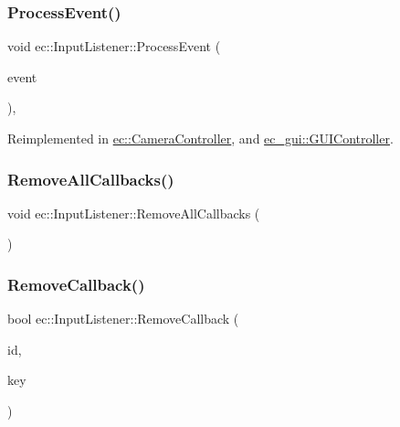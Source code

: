\mbox{\label{classec_1_1_input_listener_a25ef07efb72ac5c880cbca876ddfe66a}} 
\subsubsection{\texorpdfstring{Process\+Event()}{ProcessEvent()}}
{\footnotesize\ttfamily void ec\+::\+Input\+Listener\+::\+Process\+Event (\begin{DoxyParamCaption}\item[{const \mbox{\hyperlink{structec_1_1_input_event}{Input\+Event}} \&}]{event }\end{DoxyParamCaption})\hspace{0.3cm}{\ttfamily [protected]}, {\ttfamily [virtual]}}



Reimplemented in \mbox{\hyperlink{classec_1_1_camera_controller_a0e2d455602581a484daf81bdb60a01bc}{ec\+::\+Camera\+Controller}}, and \mbox{\hyperlink{classec__gui_1_1_g_u_i_controller_a3d9e413ddf78d41e929ec652c5409f3c}{ec\+\_\+gui\+::\+G\+U\+I\+Controller}}.

\mbox{\label{classec_1_1_input_listener_af7dd3e51508a10667973c36ef7ef48a8}} 
\subsubsection{\texorpdfstring{Remove\+All\+Callbacks()}{RemoveAllCallbacks()}}
{\footnotesize\ttfamily void ec\+::\+Input\+Listener\+::\+Remove\+All\+Callbacks (\begin{DoxyParamCaption}{ }\end{DoxyParamCaption})}

\mbox{\label{classec_1_1_input_listener_a8903c97def61ce6b9b15f36b26998883}} 
\subsubsection{\texorpdfstring{Remove\+Callback()}{RemoveCallback()}}
{\footnotesize\ttfamily bool ec\+::\+Input\+Listener\+::\+Remove\+Callback (\begin{DoxyParamCaption}\item[{const std\+::string \&}]{id,  }\item[{\mbox{\hyperlink{namespaceec_a5de6bdb8c4b2ed6e590e721ec998f964}{Event\+Key\+\_\+T}}}]{key }\end{DoxyParamCaption})}

